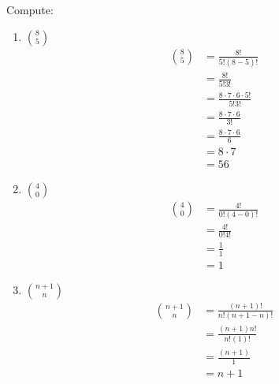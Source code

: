 \guard




\begin{exmp}
\label{exmp:computeSum}
  Compute:
  \begin{enumerate}
    \item ${8 \choose 5 }$\\
      \begin{align*}
        {8 \choose 5 } &= \frac{ 8! }{ 5!( 8-5)! }\\
                       &= \frac{ 8! }{ 5!3! } \\
                       &= \frac{ 8\cdot 7\cdot 6 \cdot 5! }{ 5!3! } \\
                       &= \frac{ 8\cdot 7\cdot 6 }{ 3! } \\
                       &= \frac{ 8\cdot 7\cdot 6 }{ 6 } \\
                       &= 8\cdot 7 \\
                       &= 56
      \end{align*}
    \item ${4 \choose 0 }$\\
      \begin{align*}
        {4 \choose 0 } &= \frac{ 4! }{ 0!( 4-0)! }\\
                       &= \frac{ 4! }{ 0!4! } \\
                       &= \frac{ 1 }{ 1 } \\
                       &= 1
      \end{align*}
    \item ${ {n+1} \choose n }$\\
      \begin{align*}
        { {n+1} \choose n }  &= \frac{ (n+1)! }{ n!( n+1-n)! } \\
                             &= \frac{ (n+1)n! }{ n!( 1)! } \\
                             &= \frac{ (n+1) }{ 1 } \\
                             &= n+1
      \end{align*}
  \end{enumerate}
\end{exmp}
